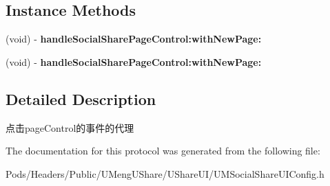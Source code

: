 \subsection*{Instance Methods}
\begin{DoxyCompactItemize}
\item 
\mbox{\label{protocol_u_m_social_share_page_control_delegate_01-p_aa48d770e76f9bbad6ff12bcd305f537c}} 
(void) -\/ {\bfseries handle\+Social\+Share\+Page\+Control\+:with\+New\+Page\+:}
\item 
\mbox{\label{protocol_u_m_social_share_page_control_delegate_01-p_aa48d770e76f9bbad6ff12bcd305f537c}} 
(void) -\/ {\bfseries handle\+Social\+Share\+Page\+Control\+:with\+New\+Page\+:}
\end{DoxyCompactItemize}


\subsection{Detailed Description}
点击page\+Control的事件的代理 

The documentation for this protocol was generated from the following file\+:\begin{DoxyCompactItemize}
\item 
Pods/\+Headers/\+Public/\+U\+Meng\+U\+Share/\+U\+Share\+U\+I/U\+M\+Social\+Share\+U\+I\+Config.\+h\end{DoxyCompactItemize}
